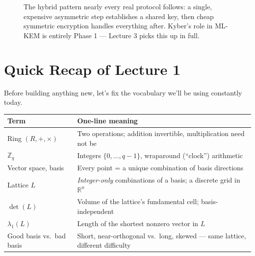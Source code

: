 \begin{figure}[ht]
\centering
{}
\caption{The hybrid pattern nearly every real protocol follows: a single, expensive asymmetric step establishes a shared key, then cheap symmetric encryption handles everything after. Kyber's role in ML-KEM is entirely Phase 1 --- Lecture 3 picks this up in full.}
\label{fig:hybrid-handshake}
\end{figure}

\section{Quick Recap of Lecture 1}
\label{sec:L2:quick-recap-of-lecture-1}

Before building anything new, let's fix the vocabulary we'll be using constantly today.

\begin{center}
\renewcommand{\arraystretch}{1.25}
\begin{tabular}{|l|l|}
\hline
\textbf{Term} & \textbf{One-line meaning} \\
\hline
Ring $(R,+,\times)$ & Two operations; addition invertible, multiplication need not be \\
$\mathbb{Z}_q$ & Integers $\{0,\ldots,q-1\}$, wraparound (``clock'') arithmetic \\
Vector space, basis & Every point = a unique combination of basis directions \\
Lattice $L$ & \emph{Integer-only} combinations of a basis; a discrete grid in $\mathbb{R}^n$ \\
$\det(L)$ & Volume of the lattice's fundamental cell; basis-independent \\
$\lambda_1(L)$ & Length of the shortest nonzero vector in $L$ \\
Good basis vs.\ bad basis & Short, near-orthogonal vs.\ long, skewed --- same lattice, different difficulty \\
\hline
\end{tabular}
\end{center}

